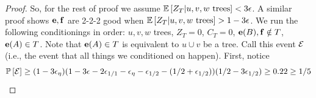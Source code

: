\begin{proof}
%
%
%
%
%
%
%


So, for the rest of proof we assume ${\mathbb{E}}\left[Z_T|u,v,w \text{ trees}\right]<3{\epsilon}$. A similar proof shows ${\bf e},{\bf f}$ are 2-2-2 good when  ${\mathbb{E}}\left[Z_T|u,v,w\text{ trees}\right]>1-3{\epsilon}$.
We run the following conditionings in order: $u,v,w$ trees, $Z_T=0$, $C_T=0$, ${\bf e}(B),{\bf f}\notin T$, ${\bf e}(A)\in T$. Note that ${\bf e}(A)\in T$ is equivalent to $u\cup v$ be a tree. Call this event ${\cal E}$ (i.e., the event that all things we conditioned on happen).
First, notice 
\begin{equation}
\label{eq:cElb}{\mathbb{P}}\left[{\cal E}\right]\geq (1-3{\epsilon}_\eta) (1-3{\epsilon}-2{\epsilon}_{1/1}-{\epsilon}_\eta-{\epsilon}_{1/2}-(1/2+{\epsilon}_{1/2}))  (1/2-3{\epsilon}_{1/2})\geq 0.22\geq 1/5
\end{equation}	



\end{proof}

